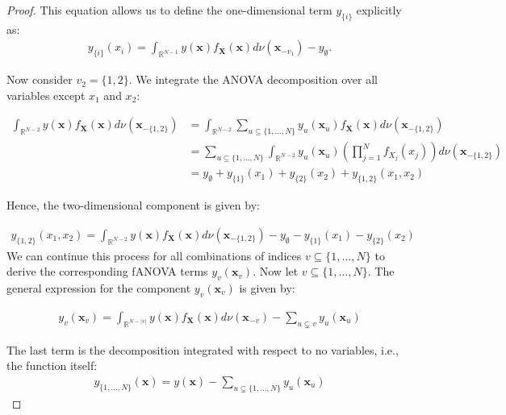 \begin{proof}
This equation allows us to define the one-dimensional term \( y_{\{i\}} \) explicitly as:
\begin{align}
    y_{\{i\}}(x_i) = \int_{\mathbb{R}^{N-1}} y(\boldsymbol{x}) f_{\boldsymbol{X}}(\boldsymbol{x}) d\nu (\boldsymbol{x}_{-v_1}) - y_{\emptyset}. \label{eq:y_i}
\end{align}

Now consider $v_2 = \{1, 2\}$. We integrate the ANOVA decomposition over all variables except $x_1$ and $x_2$:

\begin{align}
    \int_{\mathbb{R}^{N-2}} y(\boldsymbol{x}) f_{\boldsymbol{X}}(\boldsymbol{x}) d\nu(\boldsymbol{x}_{-\{1,2\}}) 
    &= \int_{\mathbb{R}^{N-2}} \sum_{u \subseteq \{1, \dots, N\}} y_u(\boldsymbol{x}_u) f_{\boldsymbol{X}}(\boldsymbol{x}) d\nu(\boldsymbol{x}_{-\{1,2\}}) \\
    &= \sum_{u \subseteq \{1, \dots, N\}} \int_{\mathbb{R}^{N-2}} y_u(\boldsymbol{x}_u) \left( \prod_{j=1}^N f_{X_j}(x_j) \right) d\nu(\boldsymbol{x}_{-\{1,2\}}) \\
    &= y_{\emptyset} + y_{\{1\}}(x_1) + y_{\{2\}}(x_2) + y_{\{1,2\}}(x_1, x_2)
\end{align}

Hence, the two-dimensional component is given by:

\begin{align}
    y_{\{1,2\}}(x_1, x_2) 
    = \int_{\mathbb{R}^{N-2}} y(\boldsymbol{x}) f_{\boldsymbol{X}}(\boldsymbol{x}) d\nu(\boldsymbol{x}_{-\{1,2\}})
    - y_{\emptyset} - y_{\{1\}}(x_1) - y_{\{2\}}(x_2) \label{eq:y_12}
\end{align}
We can continue this process for all combinations of indices \( v \subseteq \{1, \ldots, N\} \) to derive the corresponding fANOVA terms \( y_v(\boldsymbol{x}_v) \).
Now let \( v \subseteq \{1, \ldots, N\} \). The general expression for the component \( y_v(\boldsymbol{x}_v) \) is given by:

\begin{align}
    y_v(\boldsymbol{x}_v) = \int_{\mathbb{R}^{N - |v|}} y(\boldsymbol{x}) f_{\boldsymbol{X}}(\boldsymbol{x}) d\nu(\boldsymbol{x}_{-v}) 
    - \sum_{u \subsetneq v} y_u(\boldsymbol{x}_u) \label{eq:y_v_general}
\end{align}

The last term is the decomposition integrated with respect to no variables, i.e., the function itself:
\begin{align}
    y_{\{1, \ldots, N\}}(\boldsymbol{x}) = y(\boldsymbol{x}) 
    - \sum_{u \subsetneq \{1, \ldots, N\}} y_u(\boldsymbol{x}_u) \label{eq:y_full}
\end{align}


\end{proof}
